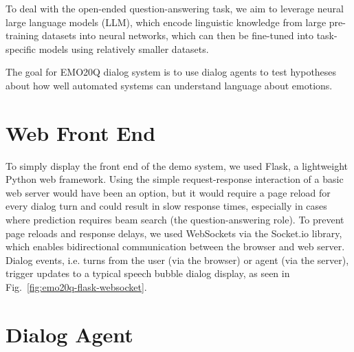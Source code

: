 \documentclass[conference]{IEEEtran}
\begin{document}
To deal with the open-ended question-answering task, we aim to
leverage neural large language models (LLM), which encode linguistic
knowledge from large pre-training datasets into neural networks,
which can then be fine-tuned into task-specific models using relatively
smaller datasets.  %


The goal for EMO20Q dialog system is to use dialog agents to test
hypotheses about how well automated systems can understand language
about emotions.




\section{Web Front End}

To simply display the front end of the demo system, we used Flask, a
lightweight Python web framework.  Using the simple request-response
interaction of a basic web server would have been an option, but it
would require a page reload for every dialog turn and could result in
slow response times, especially in cases where prediction requires
beam search (the question-answering role).  To prevent page reloads
and response delays, we used WebSockets via the Socket.io library,
which enables bidirectional communication between the browser and
web server.  Dialog events, i.e. turns from the user (via the browser)
or agent (via the server), trigger updates to a typical speech bubble
dialog display, as seen in Fig.~\ref{fig:emo20q-flask-websocket}.

\section{Dialog Agent}
\end{document}
